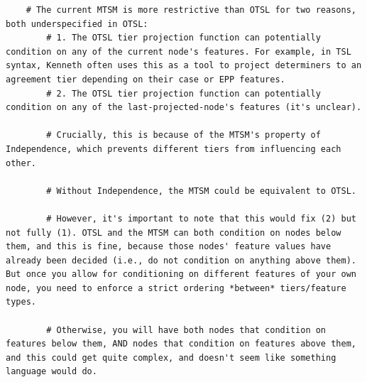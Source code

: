 \begin{verbatim}
    # The current MTSM is more restrictive than OTSL for two reasons, both underspecified in OTSL:
        # 1. The OTSL tier projection function can potentially condition on any of the current node's features. For example, in TSL syntax, Kenneth often uses this as a tool to project determiners to an agreement tier depending on their case or EPP features. 
        # 2. The OTSL tier projection function can potentially condition on any of the last-projected-node's features (it's unclear). 

        # Crucially, this is because of the MTSM's property of Independence, which prevents different tiers from influencing each other. 

        # Without Independence, the MTSM could be equivalent to OTSL. 

        # However, it's important to note that this would fix (2) but not fully (1). OTSL and the MTSM can both condition on nodes below them, and this is fine, because those nodes' feature values have already been decided (i.e., do not condition on anything above them). But once you allow for conditioning on different features of your own node, you need to enforce a strict ordering *between* tiers/feature types. 

        # Otherwise, you will have both nodes that condition on features below them, AND nodes that condition on features above them, and this could get quite complex, and doesn't seem like something language would do. 
\end{verbatim}
